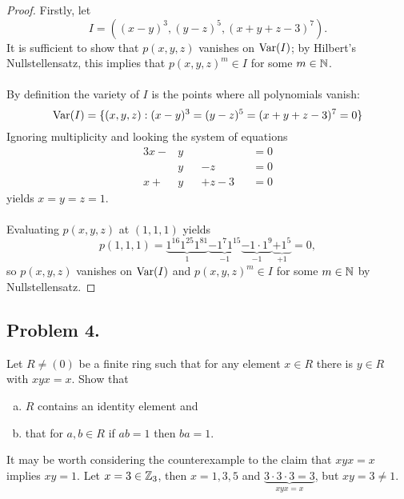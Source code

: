 \documentclass{article}
\begin{document}
\begin{proof}
  Firstly, let \[
    I = ((x - y)^3, (y - z)^5, (x + y + z - 3)^7).
  \] It is sufficient to show that $p(x,y,z)$ vanishes on $\operatorname{Var}(I)$; by
  Hilbert's Nullstellensatz,
  this implies that $p(x,y,z)^m \in I$ for some $m \in \mathbb N$.
  \\~\\
  By definition the variety of $I$ is the points where all polynomials vanish: \[
    \operatorname{Var}(I) = \{(x,y,z) : (x - y)^3 = (y - z)^5 = (x + y + z - 3)^7 = 0\}
  \]
  Ignoring multiplicity and looking the system of equations \begin{alignat*}{3}
    x - & y &&         && = 0 \\
        & y && - z     && = 0 \\
    x + & y && + z - 3 && = 0
  \end{alignat*} yields $x = y = z = 1$.
  \\~\\
  Evaluating $p(x,y,z)$ at $(1,1,1)$ yields \[
    p(1,1,1) =
      \underbrace{1^{16}1^{25}1^{81}}_1
      \underbrace{- 1^{7}1^{15}}_{-1}
      \underbrace{- 1\cdot1^{9}}_{-1}
      \underbrace{+ 1^5}_{+1} = 0,
  \] so $p(x,y,z)$ vanishes on $\operatorname{Var}(I)$ and
  $p(x,y,z)^m \in I$ for some $m \in \mathbb N$ by Nullstellensatz.
\end{proof}
\pagebreak

\subsection{Problem 4.}
Let $R \neq (0)$ be a finite ring such that for any element $x \in R$ there is $y \in R$ with $xyx = x$. Show that \begin{enumerate}[(a)]
  \item $R$ contains an identity element and
  \item that for $a, b \in R$ if $ab = 1$ then $ba = 1$.
\end{enumerate}

\begin{note}
  It may be worth considering the counterexample to the claim that $xyx = x$
  implies $xy = 1$. Let $x = 3 \in \mathbb Z_3$, then $x = 1, 3, 5$ and
  $\underbrace{3 \cdot 3 \cdot 3 = 3}_{xyx = x}$, but $xy = 3 \neq 1$.
\end{note}
\end{document}
